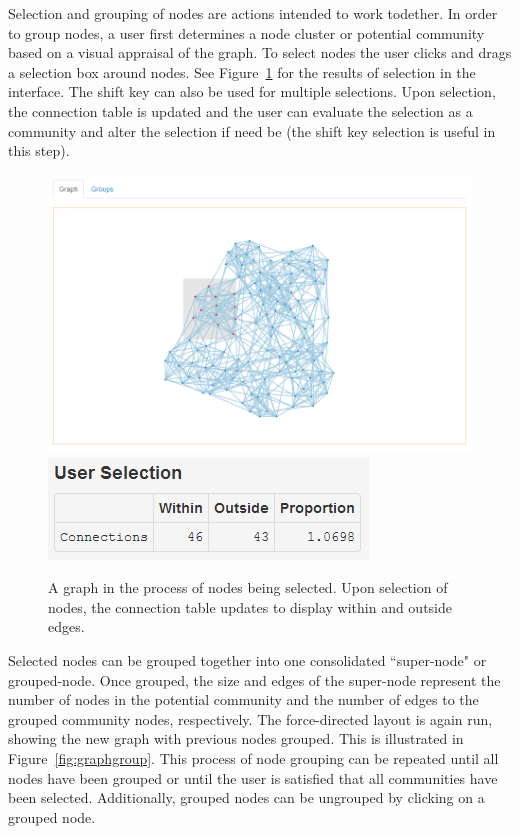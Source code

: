 \documentclass{article}\usepackage[]{graphicx}\usepackage[]{color}
\begin{document}
Selection and grouping of nodes are actions intended to work todether. In order to group nodes, a user first determines a node cluster or potential community based on a visual appraisal of the graph. To select nodes the user clicks and drags a selection box around nodes. See Figure~\ref{fig:graphselect} for the results of selection in the interface. The shift key can also be used for multiple selections. Upon selection, the connection table is updated and the user can evaluate the selection as a community and alter the selection if need be (the shift key selection is useful in this step).

\begin{figure}[H]
\centering
\includegraphics[width=\textwidth]{images/graphselect.png}
\includegraphics[]{images/tableselect.png}
\caption{\label{fig:graphselect} A graph in the process of nodes being selected. Upon selection of nodes, the connection table updates to display within and outside edges.}
\end{figure}

Selected nodes can be grouped together into one consolidated ``super-node" or grouped-node. Once grouped, the size and edges of the super-node represent the number of nodes in the potential community and the number of edges to the grouped community nodes, respectively. The force-directed layout is again run, showing the new graph with previous nodes grouped. This is illustrated in Figure~\ref{fig:graphgroup}. This process of node grouping can be repeated until all nodes have been grouped or until the user is satisfied that all communities have been selected. Additionally, grouped nodes can be ungrouped by clicking on a grouped node. 
\end{document}
